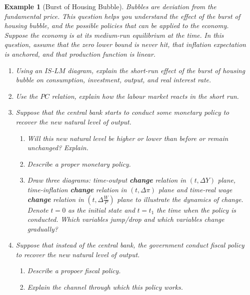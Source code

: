 \documentclass[12pt]{article}
\newtheorem{example}{Example}
\begin{document}
\begin{example}[Burst of Housing Bubble]
  Bubbles are deviation from the fundamental price. This question helps you understand the effect of the burst of housing bubble, and the possible policies that can be applied to the economy. Suppose the economy is at its medium-run equilibrium at the time. In this question, assume that the zero lower bound is never hit, that inflation expectation is anchored, and that production function is linear.
  \begin{enumerate}[label=(\arabic*)]
    \item Using an $IS$-$LM$ diagram, explain the short-run effect of the burst of housing bubble on consumption, investment, output, and real interest rate.
    \vspace{80pt}
    \newpage
    \item Use the $PC$ relation, explain how the labour market reacts in the short run. 
    \vspace{80pt}
    \item Suppose that the central bank starts to conduct some monetary policy to recover the new natural level of output.
    \begin{enumerate}[label=\alph*.]
      \item Will this new natural level be higher or lower than before or remain unchanged? Explain.
      \vspace{80pt}
      \item Describe a proper monetary policy.
      \vspace{80pt}
      \item Draw three diagrams: time-output \textbf{change} relation in $(t, \Delta Y)$ plane, time-inflation \textbf{change}  relation in $(t, \Delta \pi)$ plane and time-real wage \textbf{change}  relation in $(t, \Delta \frac{W}{P})$ plane to illustrate the dynamics of change. Denote $t=0$ as the initial state and $t=t_1$ the time when the policy is conducted. Which variables jump/drop and which variables change gradually?
    \end{enumerate}
    \vspace{120pt}
    \newpage
    \item Suppose that instead of the central bank, the government conduct fiscal policy to recover the new natural level of output. 
    \begin{enumerate}
      \item Describe a propoer fiscal policy.
      \vspace{80pt}
      \item Explain the channel through which this policy works.
      \vspace{80pt}
    \end{enumerate}
  \end{enumerate}
\end{example}
\end{document}
